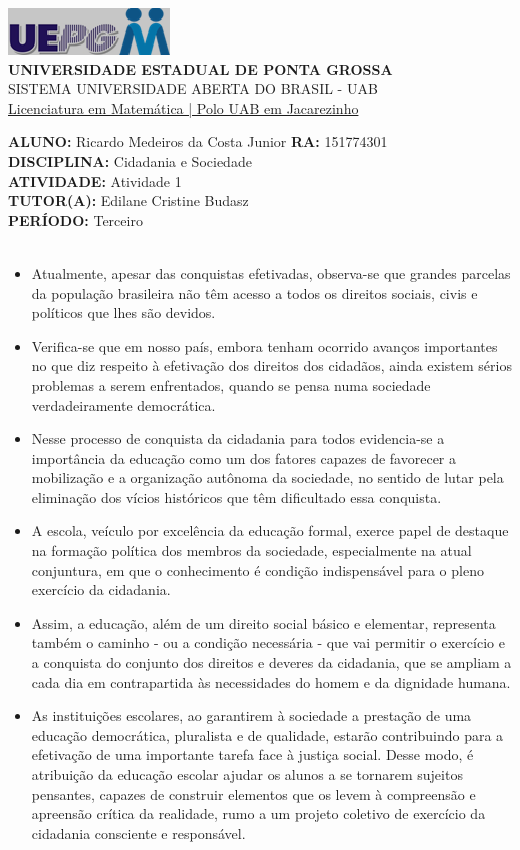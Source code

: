 \documentclass[a4paper, 12pt]{article}
\begin{document}
\begin{flushleft}\includegraphics{logo}\\
\textbf{UNIVERSIDADE ESTADUAL DE PONTA GROSSA} \\
SISTEMA UNIVERSIDADE ABERTA DO BRASIL - UAB \\
\underline{Licenciatura em Matemática | Polo UAB em Jacarezinho}\end{flushleft} 
\textbf{ALUNO:} Ricardo Medeiros da Costa Junior   \textbf{RA:} 151774301 \\
\textbf{DISCIPLINA:} Cidadania e Sociedade \\
\textbf{ATIVIDADE:} Atividade 1 \\
\textbf{TUTOR(A):} Edilane Cristine Budasz\\
\textbf{PERÍODO:} Terceiro \\ \\
\begin{itemize}
\item Atualmente, apesar das conquistas efetivadas, observa-se que grandes parcelas da população brasileira não têm acesso a todos os direitos sociais, civis e políticos que lhes são devidos.
\item Verifica-se que em nosso país, embora tenham ocorrido avanços importantes no que diz respeito à efetivação dos direitos dos cidadãos, ainda existem sérios problemas a serem enfrentados, quando se pensa numa sociedade verdadeiramente democrática.
\item Nesse processo de conquista da cidadania para todos evidencia-se a importância da educação como um dos fatores capazes de favorecer a mobilização e a organização autônoma da sociedade, no sentido de lutar pela eliminação dos vícios históricos que têm dificultado essa conquista.
\item A escola, veículo por excelência da educação formal, exerce papel de destaque na formação política dos membros da sociedade, especialmente na atual conjuntura, em que o conhecimento é condição indispensável para o pleno exercício da cidadania.
\item Assim, a educação, além de um direito social básico e elementar, representa também o caminho - ou a condição necessária - que vai permitir o exercício e a conquista do conjunto dos direitos e deveres da cidadania, que se ampliam a cada dia em contrapartida às necessidades do homem e da dignidade humana.
\item As instituições escolares, ao garantirem à sociedade a prestação de uma educação democrática, pluralista e de qualidade, estarão contribuindo para a efetivação de uma importante tarefa face à justiça social.
  Desse modo, é atribuição da educação escolar ajudar os alunos a se tornarem sujeitos pensantes, capazes de construir elementos que os levem à compreensão e apreensão crítica da realidade, rumo a um projeto coletivo de exercício da cidadania consciente e responsável.
\end{itemize}
\end{document}
